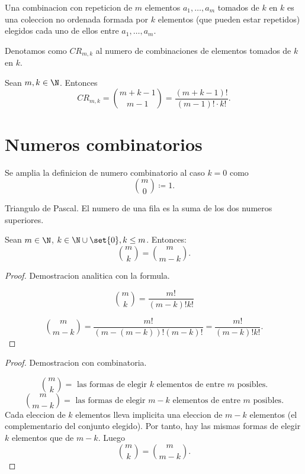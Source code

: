 \begin{definition}
	Una combinacion con repeticion de \(m \) elementos \(a_1,\ldots,a_m \) tomados de \(k \) en \(k \) es una coleccion no ordenada formada por \(k \) elementos (que pueden estar repetidos) elegidos cada uno de ellos entre \(a_1,\ldots, a_m \).

	Denotamos como \(CR_{m,k}\) al numero de combinaciones de elementos tomados de \(k \) en \(k \).
\end{definition}

\begin{theorem}
	Sean \(m,k \in \N \). Entonces
	\[
		CR_{m,k} = \binom{m+k-1}{m-1} = \frac{(m+k-1)!}{(m-1)! \cdot k!}.
	\]
\end{theorem}

\section{Numeros combinatorios}
\begin{definition}
	Se amplia la definicion de numero combinatorio al caso \(k = 0 \) como
	\[
		\binom{m }{0 } \coloneqq 1.
	\]
\end{definition}

Triangulo de Pascal. El numero de una fila es la suma de los dos numeros superiores.

\begin{theorem}
	Sean \(m \in \N \), \(k \in \N \cup \set{0}, k \leq m \). Entonces:
	\[
		\binom{m }{k }= \binom{m }{m - k }.
	\]
\end{theorem}
\begin{proof}
	Demostracion analitica con la formula.

	\[\binom{m }{k } = \frac{m! }{(m-k)! k! }\]

	\[
		\binom{m }{m - k } = \frac{m! }{(m - (m-k))! (m-k)! } = \frac{m! }{(m-k)! k! }.
	\]
\end{proof}
\begin{proof}
	Demostracion con combinatoria.

	\[
		\binom{m }{k } = \text{ las formas de elegir } k \text{ elementos de entre } m \text{ posibles.}
	\]
	\[
		\binom{m }{m-k } = \text{ las formas de elegir } m - k \text{ elementos de entre } m \text{ posibles.}
	\]
	Cada eleccion de \(k \) elementos lleva implicita una eleccion de \(m - k \) elementos (el complementario del conjunto elegido). Por tanto, hay las mismas formas de elegir \(k \) elementos que de \(m-  k\). Luego
	\[
		\binom{m }{k } = \binom{m }{m - k }.
	\]
\end{proof}

